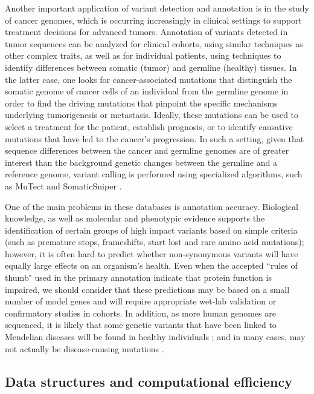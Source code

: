 Another important application of variant detection and annotation is in the study of cancer genomes, which is occurring increasingly in clinical settings to support treatment decisions for advanced tumors. Annotation of variants detected in tumor sequences can be analyzed for clinical cohorts, using similar techniques as other complex traits, as well as for individual patients, using techniques to identify differences between somatic (tumor) and germline (healthy) tissues. In the latter case, one looks for cancer-associated mutations that distinguish the somatic genome of cancer cells of an individual from the germline genome in order to find the driving mutations that pinpoint the specific mechanisms underlying tumorigenesis or metastasis. Ideally, these mutations can be used to select a treatment for the patient, establish prognosis, or to identify causative mutations that have led to the cancer's progression. In such a setting, given that sequence differences between the cancer and germline genomes are of greater interest than the background genetic changes between the germline and a reference genome, variant calling is performed using specialized algorithms, such as MuTect  \cite{cibulskis2013sensitive} and SomaticSniper  \cite{larson2012somaticsniper}.

One of the main problems in these databases is annotation accuracy. Biological knowledge, as well as molecular and phenotypic evidence supports the identification of certain groups of high impact variants based on simple criteria (such as premature stops, frameshifts, start lost and rare amino acid mutations); however, it is often hard to predict whether non-synonymous variants will have equally large effects on an organism's health. Even when the accepted ``rules of thumb" used in the primary annotation indicate that protein function is impaired, we should consider that these predictions may be based on a small number of model genes and will require appropriate wet-lab validation or confirmatory studies in cohorts. In addition, as more human genomes are sequenced, it is likely that some genetic variants that have been linked to Mendelian diseases will be found in healthy individuals  \cite{riggs2013towards}; and in many cases, may not actually be disease-causing mutations  \cite{bell2011carrier}.

\subsection{Data structures and computational efficiency}

